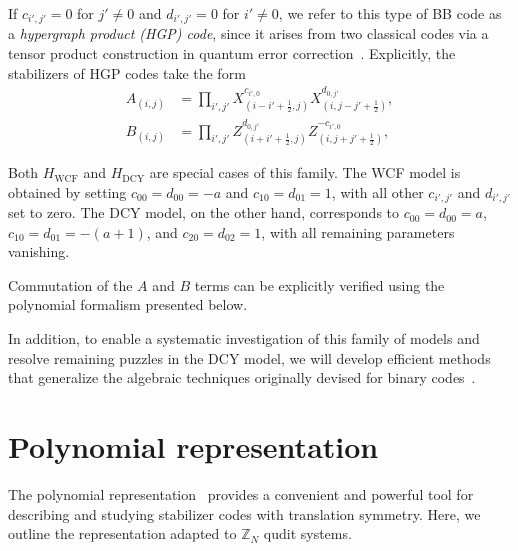 \documentclass[aps,prb,english,superscriptaddress,twocolumn,tightenlines,showpacs,longbibliography,floatfix,amsfonts]{revtex4-2}
\begin{document}
If $c_{i',j'}=0$ for $j'\neq 0$ and $d_{i',j'}=0$ for $i'\neq 0$, we refer to this type of BB code as a \textit{hypergraph product (HGP) code}, since it arises from two classical codes via a tensor product construction in quantum error correction~\cite{Tillich2014}. Explicitly, the stabilizers of HGP codes take the form
\begin{equation}
    \begin{aligned}
    A_{(i,j)}&= \prod_{i',j'}X^{c_{i',0}}_{(i-i'+\frac{1}{2},j)}X^{d_{0,j'}}_{(i,j-j'+\frac{1}{2})}, \\
    B_{(i,j)}&= \prod_{i',j'}Z^{d_{0,j'}}_{(i+i'+\frac{1}{2},j)}Z^{-c_{i',0}}_{(i,j+j'+\frac{1}{2})}, 
\end{aligned}
\end{equation}
  
Both \( H_{\operatorname{WCF}} \) and \( H_{\operatorname{DCY}} \) are special cases of this family. The WCF model is obtained by setting \( c_{00} = d_{00} = -a \) and \( c_{10} = d_{01} = 1 \), with all other $c_{i',j'}$ and $d_{i',j'}$ set to zero. The DCY model, on the other hand, corresponds to \( c_{00} = d_{00} = a \), \( c_{10} = d_{01} = -(a + 1) \), and \( c_{20} = d_{02} = 1 \), with all remaining parameters vanishing.  

Commutation of the $A$ and $B$ terms can be explicitly verified using the polynomial formalism presented below. 
 
In addition, to enable a systematic investigation of this family of models and resolve remaining puzzles in the DCY model, we will develop efficient methods that generalize the algebraic techniques originally devised for binary codes~\cite{Haah2013,Chen2025}. 








\section{Polynomial representation\label{sec3}}
The polynomial representation~\cite{Haah2013} provides a convenient and powerful tool for describing and studying stabilizer codes with translation symmetry. Here, we outline the representation adapted to $\mathbb{Z}_N$ qudit systems.
\end{document}
